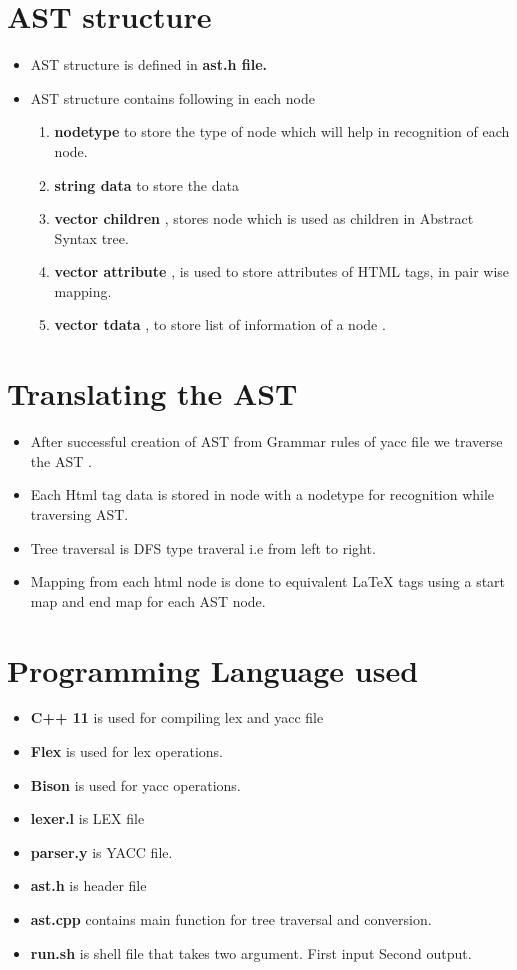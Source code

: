 \documentclass{article}
\begin{document}
\section{ AST structure }
\begin{itemize}
\item AST structure is defined in \textbf{ ast.h file.}
\item AST structure contains following in each node
\begin{enumerate}
\item\textbf{nodetype} to store the type of node which will help in recognition of each node.
\item\textbf{string data} to store the data 
\item\textbf{vector children} , stores node which is used as children in Abstract Syntax tree. 
\item\textbf{vector attribute} , is used to store attributes of HTML tags, in pair wise mapping. 
\item\textbf{vector tdata } , to store list of information of a node .
\end{enumerate}
\end{itemize}
\section{ Translating the AST }
\begin{itemize}
\item After successful creation of AST from Grammar rules of yacc file we traverse the AST .
\item Each Html tag data is stored in node with a nodetype for recognition while traversing AST.
\item Tree traversal is DFS type traveral i.e from left to right. 
\item Mapping from each html node is done to equivalent LaTeX tags using a start map and end map for each AST node. 
\end{itemize}
\section{ Programming Language used }
\begin{itemize}
\item\textbf{C++ 11} is used for compiling lex and yacc file 
\item\textbf{Flex} is used for lex operations. 
\item\textbf{Bison} is used for yacc operations. 
\item\textbf{lexer.l} is LEX file
\item\textbf{parser.y} is YACC file.
\item\textbf{ast.h} is header file 
\item\textbf{ast.cpp} contains main function for tree traversal and conversion.
\item\textbf{run.sh} is shell file that takes two argument. First input Second output.
\end{itemize}
\end{document}
